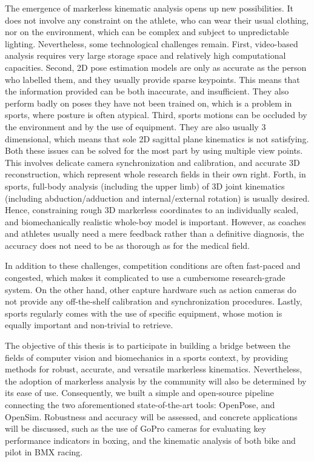 \newpage
The emergence of markerless kinematic analysis opens up new possibilities. It does not involve any constraint on the athlete, who can wear their usual clothing, nor on the environment, which can be complex and subject to unpredictable lighting. Nevertheless, some technological challenges remain. First, video-based analysis requires very large storage space and relatively high computational capacities. Second, 2D pose estimation models are only as accurate as the person who labelled them, and they usually provide sparse keypoints. This means that the information provided can be both inaccurate, and insufficient. They also perform badly on poses they have not been trained on, which is a problem in sports, where posture is often atypical. Third, sports motions can be occluded by the environment and by the use of equipment. They are also usually 3 dimensional, which means that sole 2D sagittal plane kinematics is not satisfying. Both these issues can be solved for the most part by using multiple view points. This involves delicate camera synchronization and calibration, and accurate 3D reconstruction, which represent whole research fields in their own right. Forth, in sports, full-body analysis (including the upper limb) of 3D joint kinematics (including abduction/adduction and internal/external rotation) is usually desired. Hence, constraining rough 3D markerless coordinates to an individually scaled, and biomechanically realistic whole-boy model is important. However, as coaches and athletes usually need a mere feedback rather than a definitive diagnosis, the accuracy does not need to be as thorough as for the medical field. 

In addition to these challenges, competition conditions are often fast-paced and congested, which makes it complicated to use a cumbersome research-grade system. On the other hand, other capture hardware such as action cameras do not provide any off-the-shelf calibration and synchronization procedures. Lastly, sports regularly comes with the use of specific equipment, whose motion is equally important and non-trivial to retrieve. 

The objective of this thesis is to participate in building a bridge between the fields of computer vision and biomechanics in a sports context, by providing methods for robust, accurate, and versatile markerless kinematics. Nevertheless, the adoption of markerless analysis by the community will also be determined by its ease of use. Consequently, we built a simple and open-source pipeline connecting the two aforementioned state-of-the-art tools: OpenPose, and OpenSim. Robustness and accuracy will be assessed, and concrete applications will be discussed, such as the use of GoPro cameras for evaluating key performance indicators in boxing, and the kinematic analysis of both bike and pilot in BMX racing.


